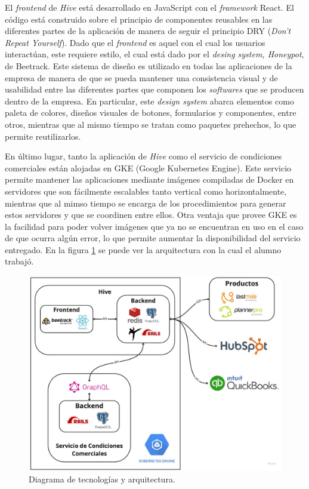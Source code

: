    El \textit{frontend} de \textit{Hive} está desarrollado en JavaScript con el \textit{framework} React. El código está construido sobre el principio de componentes reusables en las diferentes partes de la aplicación de manera de seguir el principio DRY (\textit{Don't Repeat Yourself}). Dado que el \textit{frontend} es aquel con el cual los usuarios interactúan, este requiere estilo, el cual está dado por el \textit{desing system, Honeypot}, de Beetrack. Este sistema de diseño es utilizado en todas las aplicaciones de la empresa de manera de que se pueda mantener una consistencia visual y de usabilidad entre las diferentes partes que componen los \textit{softwares} que se producen dentro de la empresa. En particular, este \textit{design system} abarca elementos como paleta de colores, diseños visuales de botones, formularios y componentes, entre otros, mientras que al mismo tiempo se tratan como paquetes prehechos, lo que permite reutilizarlos.
   
   
   En último lugar, tanto la aplicación de \textit{Hive} como el servicio de condiciones comerciales están alojadas en GKE (Google Kubernetes Engine). Este servicio permite mantener las aplicaciones mediante imágenes compiladas de Docker en servidores que son fácilmente escalables tanto vertical como horizontalmente, mientras que al mimso tiempo se encarga de los procedimientos para generar estos servidores y que se coordinen entre ellos. Otra ventaja que provee GKE es la facilidad para poder volver imágenes que ya no se encuentran en uso en el caso de que ocurra algún error, lo que permite aumentar la disponibilidad del servicio entregado. En la figura \ref{fig:arquitectura} se puede ver la arquitectura con la cual el alumno trabajó.
   
   \begin{figure}
       \centering
       \includegraphics[width=0.75\linewidth]{figures/arquitectura.jpg}
       \caption{Diagrama de tecnologías y arquitectura.}
       \label{fig:arquitectura}
   \end{figure}
   
